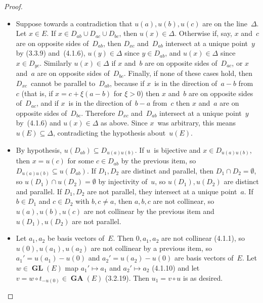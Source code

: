 \documentclass[letterpaper,12pt]{article}
\newcommand{\union}{\cup}
\newcommand{\sect}{\cap}
\newcommand{\after}{\circ}
\DeclareMathOperator{\GL}{\mathbf{GL}}
\DeclareMathOperator{\GA}{\mathbf{GA}}
\theoremstyle{definition}
\theoremstyle{remark}
\begin{document}
\begin{proof}\
\begin{itemize}[itemsep=0pt]
\item Suppose towards a contradiction that \(u(a),u(b),u(c)\) are on the line~\(\Delta\). Let \(x\in E\). If \(x\in D_{ab}\union D_{ac}\union D_{bc}\), then \(u(x)\in\Delta\). Otherwise if, say, \(x\) and~\(c\) are on opposite sides of~\(D_{ab}\), then \(D_{xc}\) and~\(D_{ab}\) intersect at a unique point~\(y\) by (3.3.9) and~(4.1.6), \(u(y)\in\Delta\) since \(y\in D_{ab}\), and \(u(x)\in\Delta\) since \(x\in D_{yc}\). Similarly \(u(x)\in\Delta\) if \(x\) and~\(b\) are on opposite sides of~\(D_{ac}\), or \(x\) and~\(a\) are on opposite sides of~\(D_{bc}\). Finally, if none of these cases hold, then \(D_{xc}\)~cannot be parallel to~\(D_{ab}\), because if \(x\)~is in the direction of~\(a-b\) from~\(c\) (that is, if \(x=c+\xi(a-b)\) for \(\xi>0\)) then \(x\) and~\(b\) are on opposite sides of~\(D_{ac}\), and if \(x\)~is in the direction of~\(b-a\) from~\(c\) then \(x\) and~\(a\) are on opposite sides of~\(D_{bc}\). Therefore \(D_{xc}\) and~\(D_{ab}\) intersect at a unique point~\(y\) by~(4.1.6) and \(u(x)\in\Delta\) as above. Since \(x\)~was arbitrary, this means \(u(E)\subseteq\Delta\), contradicting the hypothesis about~\(u(E)\).

\item By hypothesis, \(u(D_{ab})\subseteq D_{u(a)u(b)}\). If \(u\)~is bijective and \(x\in D_{u(a)u(b)}\), then \(x=u(c)\) for some \(c\in D_{ab}\) by the previous item, so \(D_{u(a)u(b)}\subseteq u(D_{ab})\). If \(D_1,D_2\) are distinct and parallel, then \(D_1\sect D_2=\emptyset\), so \(u(D_1)\sect u(D_2)=\emptyset\) by injectivity of~\(u\), so \(u(D_1),u(D_2)\) are distinct and parallel. If \(D_1,D_2\) are not parallel, they intersect at a unique point~\(a\). If \(b\in D_1\) and \(c\in D_2\) with \(b,c\ne a\), then \(a,b,c\) are not collinear, so \(u(a),u(b),u(c)\) are not collinear by the previous item and \(u(D_1),u(D_2)\) are not parallel.

\item Let \(a_1,a_2\) be basis vectors of~\(E\). Then \(0,a_1,a_2\) are not collinear (4.1.1), so \(u(0),u(a_1),u(a_2)\) are not collinear by a previous item, so \(a_1'=u(a_1)-u(0)\) and \(a_2'=u(a_2)-u(0)\) are basis vectors of~\(E\). Let \(w\in\GL(E)\) map \(a_1'\mapsto a_1\) and \(a_2'\mapsto a_2\) (4.1.10) and let \(v=w\after t_{-u(0)}\in\GA(E)\) (3.2.19). Then \(u_1=v\after u\) is as desired.


\end{itemize}
\end{proof}
\end{document}
